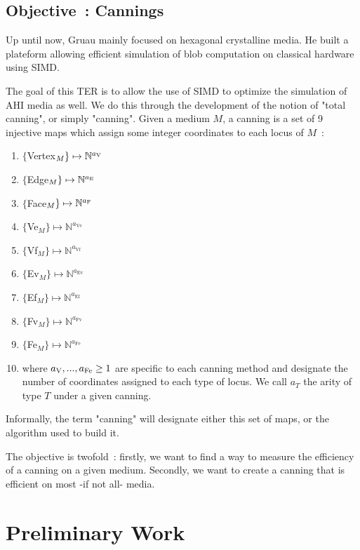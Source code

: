 \documentclass{report}
\begin{document}
\subsection{Objective~: Cannings}

Up until now, Gruau mainly focused on hexagonal crystalline media. He built a plateform allowing efficient simulation of blob computation on classical hardware using SIMD\supercite{Voronoi, platform_CA2}. 

The goal of this TER is to allow the use of SIMD to optimize the simulation of AHI media as well. We do this through the development of the notion of "total canning", or simply "canning". Given a medium $M$, a canning is a set of 9 injective maps which assign some integer coordinates to each locus of $M$~:
\begin{enumerate}
	\item $\{$Vertex$_M\} \mapsto \mathbb{N}^{a_\text V}$
	\item $\{$Edge$_M\} \mapsto \mathbb{N}^{a_\text E}$
	\item $\{$Face$_M\} \mapsto \mathbb{N}^{a_\text F}$
	\item $\{$Ve$_M\} \mapsto \mathbb{N}^{a_\text{Ve}}$
	\item $\{$Vf$_M\} \mapsto \mathbb{N}^{a_\text{Vf}}$
	\item $\{$Ev$_M\} \mapsto \mathbb{N}^{a_\text{Ev}}$
	\item $\{$Ef$_M\} \mapsto \mathbb{N}^{a_\text{Ef}}$
	\item $\{$Fv$_M\} \mapsto \mathbb{N}^{a_\text{Fv}}$
	\item $\{$Fe$_M\} \mapsto \mathbb{N}^{a_\text{Fe}}$
	\item[] where $a_\text V, ..., a_\text{Fe} \geq 1$ are specific to each canning method and designate the number of coordinates assigned to each type of locus. We call $a_T$ the arity of type $T$ under a given canning.
\end{enumerate}
Informally, the term "canning" will designate either this set of maps, or the algorithm used to build it.

The objective is twofold~: firstly, we want to find a way to measure the efficiency of a canning on a given medium. Secondly, we want to create a canning that is efficient on most -if not all- media.

\section{Preliminary Work}
\end{document}
